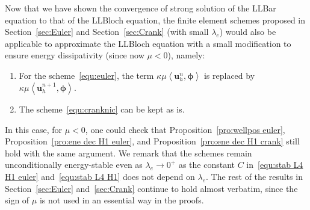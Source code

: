 \documentclass[11pt, reqno]{amsart}
\theoremstyle{definition}
\theoremstyle{remark}
\numberwithin{equation}{section}
\newcommand{\bff}{\boldsymbol}
\newcommand{\bb}{\mathbb}
\newcommand{\ddt}{\frac{\mathrm{d}}{\mathrm{d}t}}
\newcommand{\norm}[2]{\left\|{#1}\right\|_{#2}}
\newcommand{\inpro}[2]{\left\langle#1,#2\right\rangle}
\newcommand{\abs}[1]{\left|{#1}\right|}
\begin{document}


Now that we have shown the convergence of strong solution of the LLBar equation to that of the LLBloch equation, the finite element schemes proposed in Section~\ref{sec:Euler} and Section~\ref{sec:Crank} (with small $\lambda_e$) would also be applicable to approximate the LLBloch equation with a small modification to ensure energy dissipativity (since now $\mu<0$), namely:
\begin{enumerate}
	\item For the scheme~\eqref{equ:euler}, the term $\kappa \mu \inpro{\bff{u}_h^n}{\bff{\phi}}$ is replaced by $\kappa \mu \inpro{\bff{u}_h^{n+1}}{\bff{\phi}}$.
	\item The scheme~\eqref{equ:cranknic} can be kept as is.
\end{enumerate}
In this case, for $\mu<0$, one could check that Proposition~\ref{pro:wellpos euler}, Proposition~\ref{pro:ene dec H1 euler}, and Proposition~\ref{pro:ene dec H1 crank} still hold with the same argument. We remark that the schemes remain unconditionally energy-stable even as $\lambda_e\to 0^+$ as the constant $C$ in~\eqref{equ:stab L4 H1 euler} and~\eqref{equ:stab L4 H1} does not depend on $\lambda_e$. The rest of the results in Section~\ref{sec:Euler} and~\ref{sec:Crank} continue to hold almost verbatim, since the sign of $\mu$ is not used in an essential way in the proofs.
\end{document}
